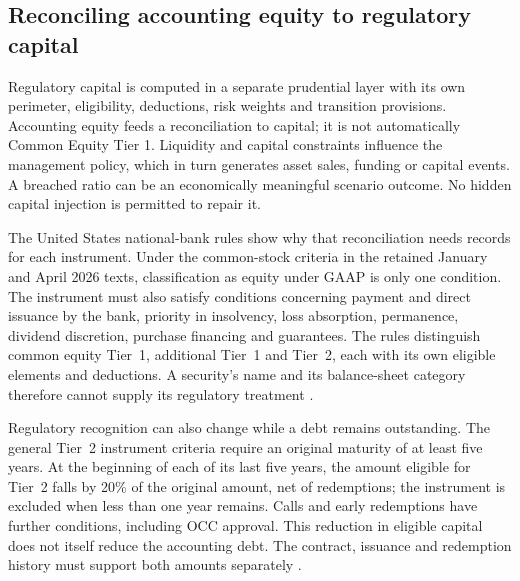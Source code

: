 \subsection{Reconciling accounting equity to regulatory capital}
\label{sec:bank-capital-reconciliation}

Regulatory capital is computed in a separate prudential layer with its own
perimeter, eligibility, deductions, risk weights and transition provisions.
Accounting equity feeds a reconciliation to capital; it is not automatically
Common Equity Tier 1. Liquidity and capital constraints influence the
management policy, which in turn generates asset sales, funding or capital
events. A breached ratio can be an economically meaningful scenario outcome.
No hidden capital injection is permitted to repair it.

The United States national-bank rules show why that reconciliation needs
records for each instrument. Under the common-stock criteria in the retained
January and April 2026 texts, classification as equity under GAAP is only one
condition. The instrument must also satisfy conditions concerning payment and
direct issuance by the bank, priority in insolvency, loss absorption, permanence,
dividend discretion, purchase financing and guarantees. The rules distinguish
common equity Tier~1, additional Tier~1 and Tier~2, each with its own eligible
elements and deductions. A security's name and its balance-sheet category
therefore cannot supply its regulatory treatment
\citep[12~CFR~3.20(a)--(d)]{occcapitaleligibility2026}.

Regulatory recognition can also change while a debt remains outstanding.
The general Tier~2 instrument criteria require an original maturity of at
least five years. At the beginning of each of its last five years, the amount
eligible for Tier~2 falls by 20\% of the original amount, net of redemptions;
the instrument is excluded when less than one year remains. Calls and early
redemptions have further conditions, including OCC approval. This reduction
in eligible capital does not itself reduce the accounting debt. The contract,
issuance and redemption history must support both amounts separately
\citep[12~CFR~3.20(d)(1), including footnote~7]{occcapitaleligibility2026}.

